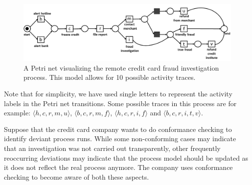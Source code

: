 \begin{figure}
	\centering
	\includegraphics[width=1\columnwidth]{figures/petrinet_cc.png}
	\caption{A Petri net visualizing the remote credit card fraud investigation process. This model allows for 10 possible activity traces.}
	\label{fig: petrinet}
\end{figure}

Note that for simplicity, we have used single letters to represent the activity labels in the Petri net transitions.
Some possible traces in this process are for example:
$\langle h,c,r,m,u \rangle$,
$\langle b,c,r,m,f \rangle$,
$\langle h,c,r,i,f \rangle$ and
$\langle b,c,r,i,t,v \rangle$.

Suppose that the credit card company wants to do conformance checking to identify deviant process runs.
While some non-conforming cases may indicate that an investigation was not carried out transparently, other frequently reoccurring deviations may indicate that the process model should be updated as it does not reflect the real process anymore.
The company uses conformance checking to become aware of both these aspects.

